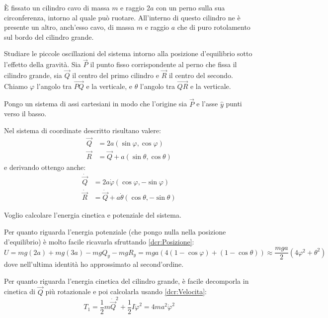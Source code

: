 \documentclass[../main.tex]{subfiles}
\begin{document}
\textex
È fissato un cilindro cavo di massa $m$ e raggio $2a$ con un perno sulla sua circonferenza, intorno al quale può ruotare.
All'interno di questo cilindro ne è presente un altro, anch'esso cavo, di massa $m$ e raggio $a$ che di puro rotolamento sul bordo del cilindro grande.

Studiare le piccole oscillazioni del sistema intorno alla posizione d'equilibrio sotto l'effetto della gravità.
\solution
Sia $\vec P$ il punto fisso corrispondente al perno che fissa il cilindro grande, sia $\vec Q$ il centro del primo cilindro e $\vec R$ il centro del secondo. Chiamo $\varphi$ l'angolo tra $\overrightarrow{PQ}$ e la verticale, e $\theta$ l'angolo tra $\overrightarrow{QR}$ e la verticale.

Pongo un sistema di assi cartesiani in modo che l'origine sia $\vec P$ e l'asse $\hat y$ punti verso il basso.

Nel sistema di coordinate descritto risultano valere:
\begin{equation}\begin{split}\label{dcr:Posizione}
	\vec Q&=2a(\sin\varphi,\cos\varphi) \\
	\vec R&=\vec Q + a(\sin\theta,\cos\theta)
\end{split}\end{equation}
e derivando ottengo anche:
\begin{equation}\begin{split}\label{dcr:Velocita}
	\dot{\vec Q}&=2a\dot{\varphi}(\cos\varphi,-\sin\varphi) \\
	\dot{\vec R}&=\dot{\vec Q} + a\dot{\theta}(\cos\theta,-\sin\theta)
\end{split}\end{equation}

Voglio calcolare l'energia cinetica e potenziale del sistema.

Per quanto riguarda l'energia potenziale (che pongo nulla nella posizione d'equilibrio) è molto facile ricavarla sfruttando \cref{dcr:Posizione}:
\begin{equation}\label{dcr:Potenziale}
	U=mg(2a)+mg(3a)-mgQ_y-mgR_y=mga\left(4(1-\cos\varphi)+(1-\cos\theta)\right)
	\approx \frac{mga}2\left(4\varphi^2+\theta^2\right)
\end{equation}
dove nell'ultima identità ho approssimato al second'ordine.

Per quanto riguarda l'energia cinetica del cilindro grande, è facile decomporla in cinetica di $\vec Q$ più rotazionale e poi calcolarla usando \cref{dcr:Velocita}:
\begin{equation}\label{dcr:Cinetica1}
	T_1=\frac 12 m {\dot{\vec Q}}^2+\frac 12I{\dot\varphi}^2=4ma^2\dot\varphi^2
\end{equation}
\end{document}
